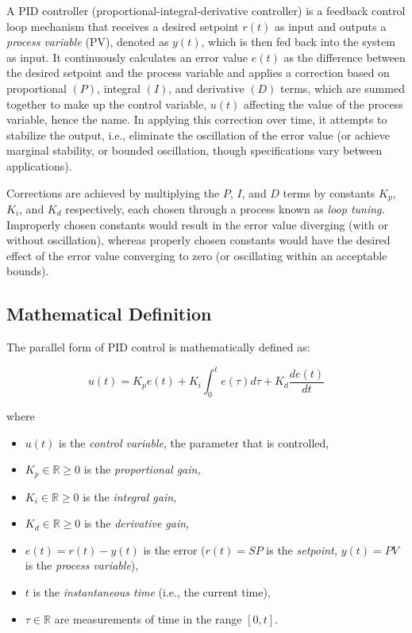 \documentclass[11pt]{article}
\newcommand{\R}{\mathbb{R}}
\theoremstyle{definition}
\begin{document}
A PID controller (proportional-integral-derivative controller) is a feedback control loop mechanism that receives a desired  setpoint 
$r(t)$ as input and outputs a \textit{process variable} (PV), denoted as $y(t)$, which is then fed back into the system
as input. It continuously calculates an  error value $e(t)$ as the difference between the desired setpoint and the process variable
and applies a correction based on  proportional $(P)$, integral $(I)$, and derivative $(D)$ terms, which are summed
together to make up the  control variable, $u(t)$ affecting the value of the process variable, hence the name.  
In applying this correction over time, it attempts to stabilize the output, i.e., eliminate the oscillation of the error value
(or achieve marginal stability, or bounded oscillation, though specifications vary between applications).

Corrections are achieved by multiplying the $P$, $I$, and $D$ terms by constants $K_{p}$, $K_{i}$, and $K_{d}$ respectively, each chosen through
a process known as \textit{loop tuning.} Improperly chosen constants would result in the error value diverging (with or without oscillation),
whereas properly chosen constants would have the desired effect of the error value converging to zero (or oscillating within 
an acceptable bounds).

\newpage

\subsection{Mathematical Definition}

The parallel form of PID control is mathematically defined as:

\begin{equation} \label{eq1}
    \boxed{
        u(t) = K_{p}e(t) + K_{i}\int_{0}^{t}e(\tau)d\tau + K_{d}\frac{de(t)}{dt}
    }
\end{equation}

where

\begin{itemize}
    \item $u(t)$ is the \textit{control variable}, the parameter that is controlled,
    \item $K_{p} \in \R \geq 0$ is the \textit{proportional gain,}
    \item $K_{i} \in \R \geq 0$ is the \textit{integral gain,}
    \item $K_{d} \in \R \geq 0$ is the \textit{derivative gain,}
    \item $e(t) = r(t) - y(t)$ is the error ($r(t) = SP$ is the \textit{setpoint,} $y(t) = PV$ is the \textit{process variable}),
    \item $t$ is the \textit{instantaneous time} (i.e., the current time),
    \item $\tau \in \R$ are measurements of time in the range $[0, t]$.
\end{itemize}
\end{document}
